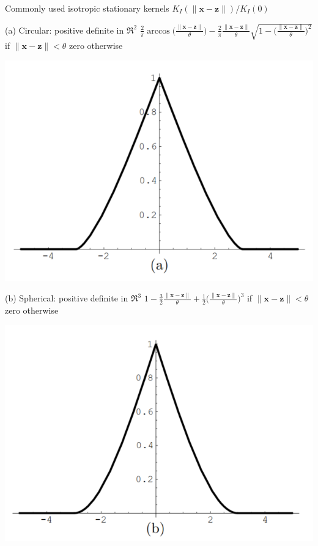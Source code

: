 \documentclass[
  ignorenonframetext,
]{beamer}
\begin{document}
\begin{frame}{Commonly used isotropic stationary kernels
\(K_I(\|\pmb x - \pmb z\|)/K_I(0)\)}
\protect\hypertarget{commonly-used-isotropic-stationary-kernels-k_ipmb-x---pmb-zk_i0}{}
\begin{block}{(a) Circular:}
\protect\hypertarget{a-circular}{}
positive definite in \(\mathfrak R^2\)
\({\frac 2 \pi} \arccos \Big(\frac {\|\pmb x - \pmb z\|} \theta \Big) - {\frac 2 \pi} \frac {\|\pmb x - \pmb z\|} \theta \sqrt {1 - \Big(\frac {\|\pmb x - \pmb z\|} \theta \Big)^2}\)
if \(\|\pmb x - \pmb z\| < \theta\) zero otherwise

\begin{center}\includegraphics[width=0.5\linewidth]{figure/marc_f2a} \end{center}
\end{block}
\end{frame}

\begin{frame}{}
\protect\hypertarget{section-7}{}
\begin{block}{(b) Spherical:}
\protect\hypertarget{b-spherical}{}
positive definite in \(\mathfrak R^3\)
\(1 - {\frac 3 2} \frac {\|\pmb x - \pmb z\|} \theta + {\frac 1 2} \Big(\frac {\|\pmb x - \pmb z\|} \theta \Big)^3\)
if \(\|\pmb x - \pmb z\| < \theta\) zero otherwise

\begin{center}\includegraphics[width=0.5\linewidth]{figure/marc_f2b} \end{center}
\end{block}
\end{frame}
\end{document}
